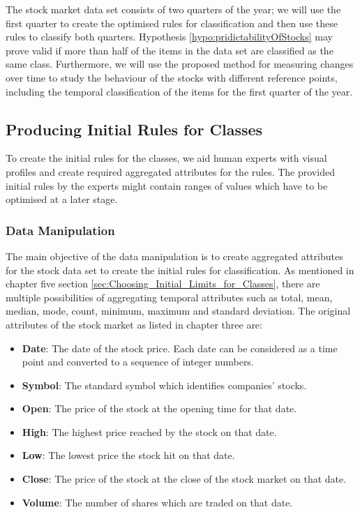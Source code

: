 The stock market data set consists of two quarters of the year; we will use the first quarter to create the optimised rules for classification and then use these rules to classify both quarters. Hypothesis \ref{hypo:pridictabilityOfStocks} may prove valid if more than half of the items in the data set are classified as the same class. Furthermore, we will use the proposed method for measuring changes over time to study the behaviour of the stocks with different reference points, including the temporal classification of the items for the first quarter of the year.

\subsection{Producing Initial Rules for Classes}

To create the initial rules for the classes, we aid human experts with visual profiles and create required aggregated attributes for the rules. The provided initial rules by the experts might contain ranges of values which have to be optimised at a later stage.


\subsubsection{Data Manipulation}

The main objective of the data manipulation is to create aggregated attributes for the stock data set to create the initial rules for classification. As mentioned in chapter five section \ref{sec:Choosing_Initial_Limits_for_Classes},  there are multiple possibilities of aggregating temporal attributes such as total, mean, median, mode, count, minimum, maximum and standard deviation. The original attributes of the stock market as listed in chapter three are:

\begin{itemize}
    \item \textbf{Date}: The date of the stock price. Each date can be considered as a time point and converted to a sequence of integer numbers.
    \item \textbf{Symbol}: The standard symbol which identifies companies' stocks.
    \item \textbf{Open}: The price of the stock at the opening time for that date.
    \item \textbf{High}: The highest price reached by the stock on that date.
    \item \textbf{Low}: The lowest price the stock hit on that date.
    
    \item \textbf{Close}: The price of the stock at the close of the stock market on that date.
    
    \item \textbf{Volume}: The number of shares which are traded on that date.
    
\end{itemize}

